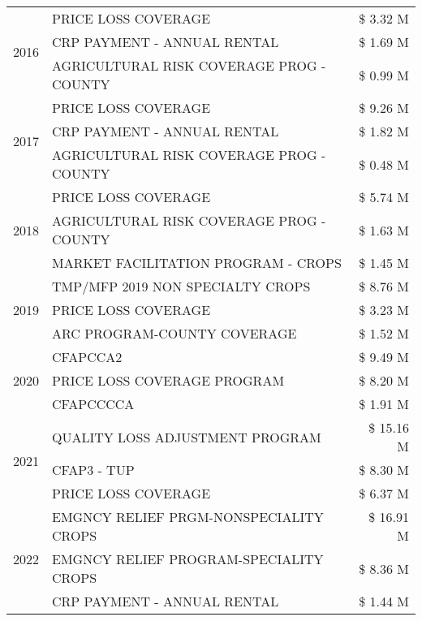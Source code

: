 \begin{tabular}{llr}
\cline{1-3}
\multirow[t]{3}{*}{2016} & PRICE LOSS COVERAGE & \$ 3.32 M \\
 & CRP PAYMENT - ANNUAL RENTAL & \$ 1.69 M \\
 & AGRICULTURAL RISK COVERAGE PROG - COUNTY & \$ 0.99 M \\
\cline{1-3}
\multirow[t]{3}{*}{2017} & PRICE LOSS COVERAGE & \$ 9.26 M \\
 & CRP PAYMENT - ANNUAL RENTAL & \$ 1.82 M \\
 & AGRICULTURAL RISK COVERAGE PROG - COUNTY & \$ 0.48 M \\
\cline{1-3}
\multirow[t]{3}{*}{2018} & PRICE LOSS COVERAGE & \$ 5.74 M \\
 & AGRICULTURAL RISK COVERAGE PROG - COUNTY & \$ 1.63 M \\
 & MARKET FACILITATION PROGRAM - CROPS & \$ 1.45 M \\
\cline{1-3}
\multirow[t]{3}{*}{2019} & TMP/MFP 2019 NON SPECIALTY CROPS & \$ 8.76 M \\
 & PRICE LOSS COVERAGE & \$ 3.23 M \\
 & ARC PROGRAM-COUNTY COVERAGE & \$ 1.52 M \\
\cline{1-3}
\multirow[t]{3}{*}{2020} & CFAPCCA2 & \$ 9.49 M \\
 & PRICE LOSS COVERAGE PROGRAM & \$ 8.20 M \\
 & CFAPCCCCA & \$ 1.91 M \\
\cline{1-3}
\multirow[t]{3}{*}{2021} & QUALITY LOSS ADJUSTMENT PROGRAM & \$ 15.16 M \\
 & CFAP3 - TUP & \$ 8.30 M \\
 & PRICE LOSS COVERAGE & \$ 6.37 M \\
\cline{1-3}
\multirow[t]{3}{*}{2022} & EMGNCY RELIEF PRGM-NONSPECIALITY CROPS & \$ 16.91 M \\
 & EMGNCY RELIEF PROGRAM-SPECIALITY CROPS & \$ 8.36 M \\
 & CRP PAYMENT - ANNUAL RENTAL & \$ 1.44 M \\
\cline{1-3}
\bottomrule
\end{tabular}
